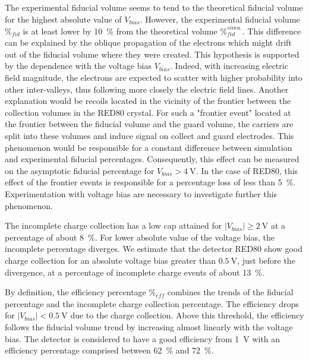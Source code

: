 The experimental fiducial volume seems to tend to the theoretical fiducial volume for the highest absolute value of $V_{bias}$. However, the experimental fiducial volume $\%_{fid}$ is at least lower by \SI{10}{\percent} from the theoretical volume $\%_{fid}^{simu.}$. This difference can be explained by the oblique propagation of the electrons which might drift out of the fiducial volume where they were created. This hypothesis is supported by the dependence with the voltage bias $V_{bias}$. Indeed, with increasing electric field magnitude, the electrons are expected to scatter with higher probability into other inter-valleys, thus following more closely the electric field lines. Another explanation would be recoils located in the vicinity of the frontier between the collection volumes in the RED80 crystal. For such a "frontier event" located at the frontier between the fiducial volume and the guard volume, the carriers are split into these volumes and induce signal on collect and guard electrodes. This phenomenon would be responsible for a constant difference between simulation and experimental fiducial percentages. Consequently, this effect can be measured on the asymptotic fiducial percentage for $V_{bias} > \SI{4}{\volt}$. In the case of RED80, this effect of the frontier events is responsible for a percentage loss of less than \SI{5}{\percent}. Experimentation with voltage bias are necessary to investigate further this phenomenon.


The incomplete charge collection has a low cap attained for $| V_{bias} | \geq \SI{2}{\volt}$ at a percentage of about \SI{8}{\percent}. For lower absolute value of the voltage bias, the incomplete percentage diverges. We estimate that the detector RED80 show good charge collection for an absolute voltage bias greater than $\SI{0.5}{\volt}$, just before the divergence, at a percentage of incomplete charge events of about \SI{13}{\percent}.

By definition, the efficiency percentage $\%_{eff}$ combines the trends of the fiducial percentage and the incomplete charge collection percentage. The efficiency drops for $| V_{bias} | < \SI{0.5}{\volt}$ due to the charge collection. Above this threshold, the efficiency follows the fiducial volume trend by increasing almost linearly with the voltage bias. The detector is considered to have a good efficiency from \SI{1}{\volt} with an efficiency percentage comprised between \SI{62}{\percent} and \SI{72}{\percent}. 


